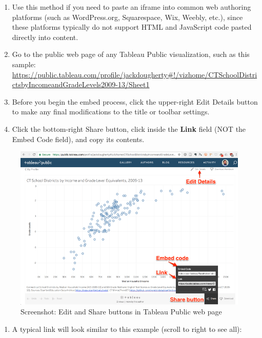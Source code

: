 \documentclass[
  english,
]{book}
\providecommand{\tightlist}{%
  \setlength{\itemsep}{0pt}\setlength{\parskip}{0pt}}
\begin{document}
\begin{enumerate}
\def\labelenumi{\arabic{enumi})}
\item
  Use this method if you need to paste an iframe into common web authoring platforms (such as WordPress.org, Squarespace, Wix, Weebly, etc.), since these platforms typically do not support HTML and JavaScript code pasted directly into content.
\item
  Go to the public web page of any Tableau Public visualization, such as this sample: \url{https://public.tableau.com/profile/jackdougherty\#!/vizhome/CTSchoolDistrictsbyIncomeandGradeLevels2009-13/Sheet1}
\item
  Before you begin the embed process, click the upper-right Edit Details button to make any final modifications to the title or toolbar settings.
\item
  Click the bottom-right Share button, click inside the \textbf{Link} field (NOT the Embed Code field), and copy its contents.
\end{enumerate}

\begin{figure}
\centering
\includegraphics{images/07-embed/tableau-edit-share.png}
\caption{Screenshot: Edit and Share buttons in Tableau Public web page}
\end{figure}

\begin{enumerate}
\def\labelenumi{\arabic{enumi})}
\setcounter{enumi}{4}
\tightlist
\item
  A typical link will look similar to this example (scroll to right to see all):
\end{enumerate}
\end{document}
